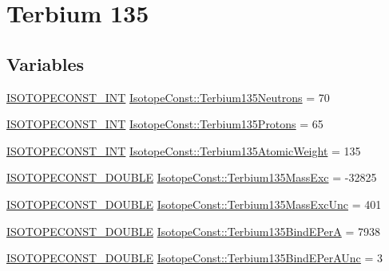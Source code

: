 \hypertarget{group___isotope_const-_terbium-_tb135}{}\section{Terbium 135}
\label{group___isotope_const-_terbium-_tb135}
\subsection*{Variables}
\begin{DoxyCompactItemize}
\item 
\mbox{\hyperlink{group___isotope_const-_macros_ga5f18360b3e99483a35c32d789e62621c}{I\+S\+O\+T\+O\+P\+E\+C\+O\+N\+S\+T\+\_\+\+I\+NT}} \mbox{\hyperlink{group___isotope_const-_terbium-_tb135_ga4f52abdc47fba74c2ba0660ee3a9ae1b}{Isotope\+Const\+::\+Terbium135\+Neutrons}} = 70
\item 
\mbox{\hyperlink{group___isotope_const-_macros_ga5f18360b3e99483a35c32d789e62621c}{I\+S\+O\+T\+O\+P\+E\+C\+O\+N\+S\+T\+\_\+\+I\+NT}} \mbox{\hyperlink{group___isotope_const-_terbium-_tb135_gaa678ee698fb3edd16117e607cb305361}{Isotope\+Const\+::\+Terbium135\+Protons}} = 65
\item 
\mbox{\hyperlink{group___isotope_const-_macros_ga5f18360b3e99483a35c32d789e62621c}{I\+S\+O\+T\+O\+P\+E\+C\+O\+N\+S\+T\+\_\+\+I\+NT}} \mbox{\hyperlink{group___isotope_const-_terbium-_tb135_ga1057a3c04b65a5a90a6bb048f73f3cfb}{Isotope\+Const\+::\+Terbium135\+Atomic\+Weight}} = 135
\item 
\mbox{\hyperlink{group___isotope_const-_macros_ga8f45a7272ce02c0b4c65c44636ed719a}{I\+S\+O\+T\+O\+P\+E\+C\+O\+N\+S\+T\+\_\+\+D\+O\+U\+B\+LE}} \mbox{\hyperlink{group___isotope_const-_terbium-_tb135_ga26b1e8f9d959613b2b389a2386f02061}{Isotope\+Const\+::\+Terbium135\+Mass\+Exc}} = -\/32825
\item 
\mbox{\hyperlink{group___isotope_const-_macros_ga8f45a7272ce02c0b4c65c44636ed719a}{I\+S\+O\+T\+O\+P\+E\+C\+O\+N\+S\+T\+\_\+\+D\+O\+U\+B\+LE}} \mbox{\hyperlink{group___isotope_const-_terbium-_tb135_gaa51a5dc1b9c224b94ce03a161188e9d2}{Isotope\+Const\+::\+Terbium135\+Mass\+Exc\+Unc}} = 401
\item 
\mbox{\hyperlink{group___isotope_const-_macros_ga8f45a7272ce02c0b4c65c44636ed719a}{I\+S\+O\+T\+O\+P\+E\+C\+O\+N\+S\+T\+\_\+\+D\+O\+U\+B\+LE}} \mbox{\hyperlink{group___isotope_const-_terbium-_tb135_ga5c4dea00447b27c82d509cea8e132dba}{Isotope\+Const\+::\+Terbium135\+Bind\+E\+PerA}} = 7938
\item 
\mbox{\hyperlink{group___isotope_const-_macros_ga8f45a7272ce02c0b4c65c44636ed719a}{I\+S\+O\+T\+O\+P\+E\+C\+O\+N\+S\+T\+\_\+\+D\+O\+U\+B\+LE}} \mbox{\hyperlink{group___isotope_const-_terbium-_tb135_ga0ca7f5a700f2ebf6db8ac7004949b85f}{Isotope\+Const\+::\+Terbium135\+Bind\+E\+Per\+A\+Unc}} = 3

\end{DoxyCompactItemize}
